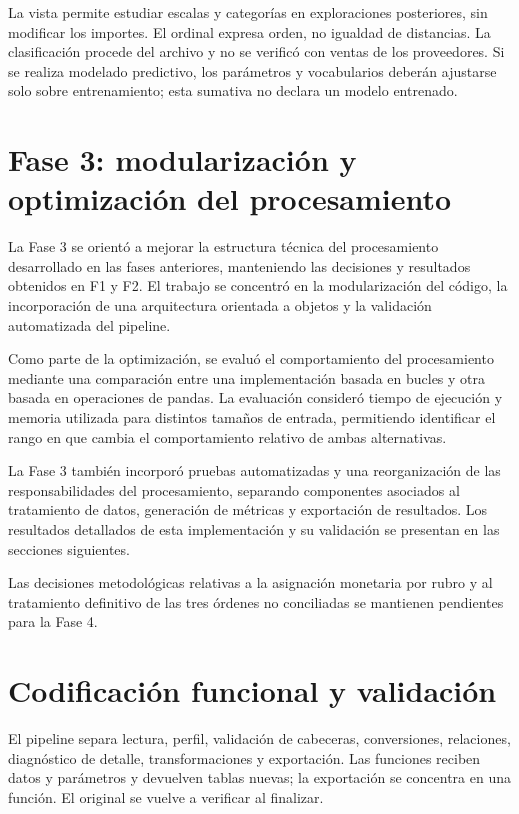 \documentclass[12pt,letterpaper]{article}
\begin{document}
La vista permite estudiar escalas y categorías en exploraciones posteriores, sin
modificar los importes. El ordinal expresa orden, no igualdad de distancias. La
clasificación procede del archivo y no se verificó con ventas de los proveedores.
Si se realiza modelado predictivo, los parámetros y vocabularios deberán ajustarse
solo sobre entrenamiento; esta sumativa no declara un modelo entrenado.

\section{Fase 3: modularización y optimización del procesamiento}

La Fase 3 se orientó a mejorar la estructura técnica del procesamiento desarrollado
en las fases anteriores, manteniendo las decisiones y resultados obtenidos en F1 y
F2. El trabajo se concentró en la modularización del código, la incorporación de
una arquitectura orientada a objetos y la validación automatizada del pipeline.

Como parte de la optimización, se evaluó el comportamiento del procesamiento
mediante una comparación entre una implementación basada en bucles y otra basada
en operaciones de pandas. La evaluación consideró tiempo de ejecución y memoria
utilizada para distintos tamaños de entrada, permitiendo identificar el rango en
que cambia el comportamiento relativo de ambas alternativas.

La Fase 3 también incorporó pruebas automatizadas y una reorganización de las
responsabilidades del procesamiento, separando componentes asociados al tratamiento
de datos, generación de métricas y exportación de resultados. Los resultados
detallados de esta implementación y su validación se presentan en las secciones
siguientes.

Las decisiones metodológicas relativas a la asignación monetaria por rubro y al
tratamiento definitivo de las tres órdenes no conciliadas se mantienen pendientes
para la Fase 4.

\section{Codificación funcional y validación}

El pipeline separa lectura, perfil, validación de cabeceras, conversiones, relaciones,
diagnóstico de detalle, transformaciones y exportación. Las funciones reciben datos
y parámetros y devuelven tablas nuevas; la exportación se concentra en una función.
El original se vuelve a verificar al finalizar.
\end{document}
